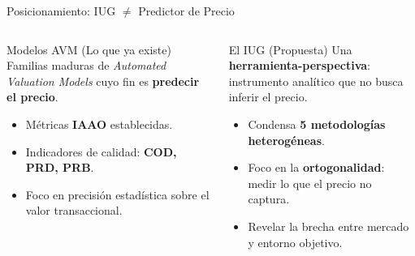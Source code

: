 \documentclass[aspectratio=169,11pt]{beamer}
\newcommand{\hi}[1]{\textcolor{inmuGreen}{\textbf{#1}}}
\begin{document}
\begin{frame}{Posicionamiento: IUG $\neq$ Predictor de Precio}
  \begin{columns}[T,onlytextwidth]
      \begin{block}{Modelos AVM (Lo que ya existe)}
        \small
        Familias maduras de \textit{Automated Valuation Models} cuyo fin es \hi{predecir el precio}.
        \begin{itemize}
          \item Métricas \textbf{IAAO} establecidas.
          \item Indicadores de calidad: \textbf{COD, PRD, PRB}.
          \item Foco en precisión estadística sobre el valor transaccional.
        \end{itemize}
      \end{block}
      \begin{alertblock}{El IUG (Propuesta)}
        \small
        Una \hi{herramienta-perspectiva}: instrumento analítico que no busca inferir el precio.
        \begin{itemize}
          \item Condensa \textbf{5 metodologías heterogéneas}.
          \item Foco en la \textbf{ortogonalidad}: medir lo que el precio no captura.
          \item Revelar la brecha entre mercado y entorno objetivo.
        \end{itemize}
      \end{alertblock}
  \end{columns}
\end{frame}
\end{document}
